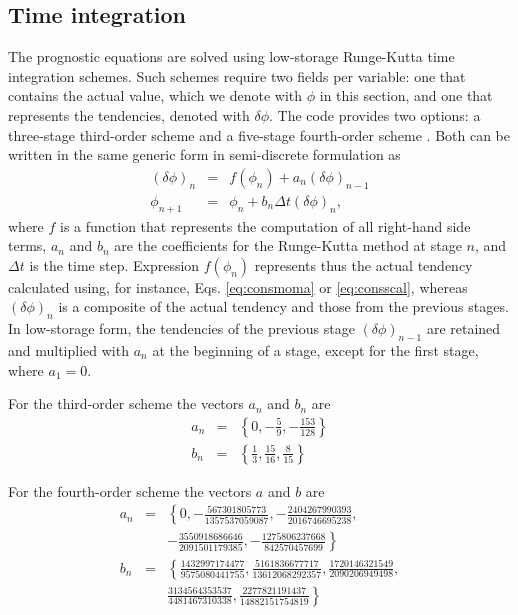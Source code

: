 \documentclass[gmd]{copernicus}
\begin{document}
\subsection{Time integration}
The prognostic equations are solved using low-storage Runge-Kutta time integration schemes. Such schemes require two fields per variable: one that contains the actual value, which we denote with $\phi$ in this section, and one that represents the tendencies, denoted with $\delta \phi$. The code provides two options: a three-stage third-order scheme \citep{Williamson1980} and a five-stage fourth-order scheme \citep{Carpenter1994}. Both can be written in the same generic form in semi-discrete formulation as
\begin{eqnarray}
\left( \delta \phi \right)_n & = & f \left( \phi_n \right) + a_n \left( \delta \phi \right)_{n-1} \\
\phi_{n+1} & = & \phi_n + b_n \Delta t \left( \delta \phi \right)_{n},
\end{eqnarray}
where $f$ is a function that represents the computation of all right-hand side terms, $a_n$ and $b_n$ are the coefficients for the Runge-Kutta method at stage $n$, and $\Delta t$ is the time step. Expression $f \left( \phi_n \right)$ represents thus the actual tendency calculated using, for instance, Eqs. \ref{eq:consmoma} or \ref{eq:consscal}, whereas $(\delta \phi)_n$ is a composite of the actual tendency and those from the previous stages. In low-storage form, the tendencies of the previous stage $\left( \delta \phi \right)_{n-1}$ are retained and multiplied with $a_n$ at the beginning of a stage, except for the first stage, where $a_1 = 0$. 

For the third-order scheme the vectors $a_n$ and $b_n$ are
\begin{eqnarray}
a_n & = & \left\{0, -\frac{5}{9}, -\frac{153}{128} \right\}\\
b_n & = & \left\{\frac{1}{3}, \frac{15}{16}, \frac{8}{15} \right\}
\end{eqnarray}

For the fourth-order scheme the vectors $a$ and $b$ are
\begin{eqnarray}
\nonumber a_n & = & \left\{0, -\frac{567301805773}{1357537059087},
-\frac{2404267990393}{2016746695238},\right.\\
& & \left. -\frac{3550918686646}{2091501179385},
-\frac{1275806237668}{842570457699} \right\}\\
\nonumber b_n & = & \left\{\frac{1432997174477}{9575080441755}, \frac{5161836677717}{13612068292357},
\frac{1720146321549}{2090206949498},\right.\\
& & \left. \frac{3134564353537}{4481467310338},
\frac{2277821191437}{14882151754819} \right\}
\end{eqnarray}
\end{document}

